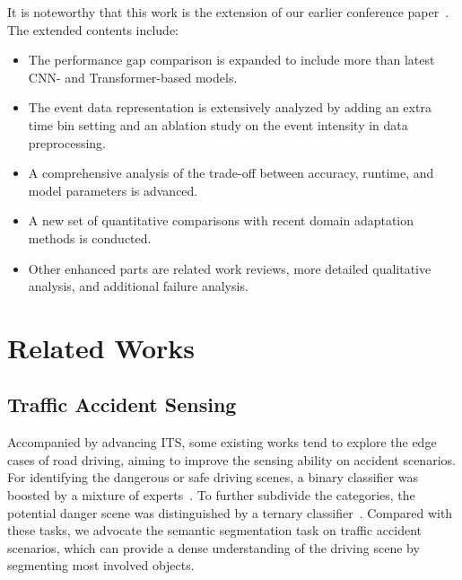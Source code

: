 \documentclass[journal]{IEEEtran}
\begin{document}
It is noteworthy that this work is the extension of our earlier conference paper~\cite{zhang2021issafe}. The extended contents include: 
\begin{itemize}
    \item The performance gap comparison is expanded to include more than  latest CNN- and Transformer-based models.
    \item The event data representation is extensively analyzed by adding an extra time bin setting and an ablation study on the event intensity in data preprocessing.
    \item A comprehensive analysis of the trade-off between accuracy, runtime, and model parameters is advanced.
    \item A new set of quantitative comparisons with recent domain adaptation methods is conducted.
    \item Other enhanced parts are related work reviews, more detailed qualitative analysis, and additional failure analysis.
\end{itemize}


\section{Related Works}
\subsection{Traffic Accident Sensing}
Accompanied by advancing ITS, some existing works tend to explore the edge cases of road driving, aiming to improve the sensing ability on accident scenarios. For identifying the dangerous or safe driving scenes, a binary classifier was boosted by a mixture of experts~\cite{pashaei2020accident_classify}. To further subdivide the categories, the potential danger scene was distinguished by a ternary classifier~\cite{Taccari2018_Near-Crash}. 
Compared with these tasks, we advocate the semantic segmentation task on traffic accident scenarios, which can provide a dense understanding of the driving scene by segmenting most involved objects.
\end{document}
